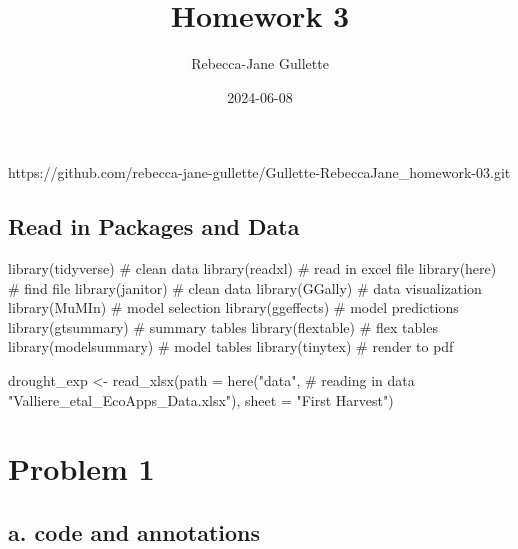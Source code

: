 \documentclass[
  letterpaper,
  DIV=11,
  numbers=noendperiod]{scrartcl}
\title{Homework 3}
\author{Rebecca-Jane Gullette}
\date{2024-06-08}
\newenvironment{Shaded}{\begin{snugshade}}{\end{snugshade}}
\newcommand{\AttributeTok}[1]{\textcolor[rgb]{0.40,0.45,0.13}{#1}}
\newcommand{\CommentTok}[1]{\textcolor[rgb]{0.37,0.37,0.37}{#1}}
\newcommand{\FunctionTok}[1]{\textcolor[rgb]{0.28,0.35,0.67}{#1}}
\newcommand{\NormalTok}[1]{\textcolor[rgb]{0.00,0.23,0.31}{#1}}
\newcommand{\OtherTok}[1]{\textcolor[rgb]{0.00,0.23,0.31}{#1}}
\newcommand{\StringTok}[1]{\textcolor[rgb]{0.13,0.47,0.30}{#1}}
\renewcommand*\contentsname{Table of contents}
\newcommand\contentsname{Table of contents}
\begin{document}
\maketitle

\renewcommand*\contentsname{Table of contents}
{
\hypersetup{linkcolor=}
\setcounter{tocdepth}{3}
\tableofcontents
}
https://github.com/rebecca-jane-gullette/Gullette-RebeccaJane\_homework-03.git

\subsection{Read in Packages and Data}\label{read-in-packages-and-data}

\begin{Shaded}
\begin{Highlighting}[]
\FunctionTok{library}\NormalTok{(tidyverse) }\CommentTok{\# clean data}
\FunctionTok{library}\NormalTok{(readxl) }\CommentTok{\# read in excel file }
\FunctionTok{library}\NormalTok{(here) }\CommentTok{\# find file}
\FunctionTok{library}\NormalTok{(janitor) }\CommentTok{\# clean data}
\FunctionTok{library}\NormalTok{(GGally) }\CommentTok{\# data visualization }
\FunctionTok{library}\NormalTok{(MuMIn) }\CommentTok{\# model selection}
\FunctionTok{library}\NormalTok{(ggeffects) }\CommentTok{\# model predictions}
\FunctionTok{library}\NormalTok{(gtsummary) }\CommentTok{\# summary tables}
\FunctionTok{library}\NormalTok{(flextable) }\CommentTok{\# flex tables}
\FunctionTok{library}\NormalTok{(modelsummary) }\CommentTok{\# model tables}
\FunctionTok{library}\NormalTok{(tinytex) }\CommentTok{\# render to pdf }

\NormalTok{drought\_exp }\OtherTok{\textless{}{-}} \FunctionTok{read\_xlsx}\NormalTok{(}\AttributeTok{path =} \FunctionTok{here}\NormalTok{(}\StringTok{"data"}\NormalTok{, }\CommentTok{\# reading in data}
                                     \StringTok{"Valliere\_etal\_EcoApps\_Data.xlsx"}\NormalTok{),}
                         \AttributeTok{sheet =} \StringTok{"First Harvest"}\NormalTok{)}
\end{Highlighting}
\end{Shaded}

\section{Problem 1}\label{problem-1}

\subsection{a. code and annotations}\label{a.-code-and-annotations}
\end{document}
